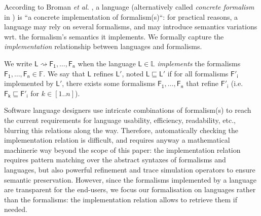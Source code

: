 According to Broman \emph{et al.} \cite{Broman-etAl:2012}, a language 
(alternatively called \emph{concrete formalism} in \cite{P:MPM:2006}) is ``a 
concrete implementation of formalism(s)``: 
for practical reasons, a language may rely on several 
formalisms, and may introduce semantics variations wrt. the formalism's 
semantics it implements. We formally capture the \emph{implementation} 
relationship between languages and formalisms.

\begin{Definition}
   
   We write $\mathsf{L} \rightsquigarrow \mathsf{F_1}, \ldots, \mathsf{F_n}$ 
when the language $\mathsf{L}\in\mathbb{L}$ \emph{implements} the formalisms 
$\mathsf{F_1}, \ldots, \mathsf{F_n}\in\mathbb{F}$. We say that $\mathsf{L}$ 
refines $\mathsf{L'}$, noted $\mathsf{L} \sqsubseteq \mathsf{L'}$ if for all 
formalisms $\mathsf{F'_i}$ implemented by $\mathsf{L'}$, there exists some 
formalisms $\mathsf{F_1}, \ldots, \mathsf{F_n}$ that refine $\mathsf{F'_i}$ 
(i.e. $\mathsf{F_k} \sqsubseteq \mathsf{F'_i}$ for $k\in [1..n]$).
\end{Definition}
\noindent
Software language designers use intricate combinations of formalism(s) to reach 
the current requirements for language usability, efficiency, readability, etc., 
blurring this relations along the way. 
Therefore, automatically checking the implementation relation is difficult, and 
requires anyway a mathematical machinerie way beyond the scope of this paper: 
the implementation relation requires pattern matching over the abstract 
syntaxes of formalisms and languages, but also powerful refinement and 
trace simulation operators to ensure semantic preservation. 
However, since the formalisms implemented by a language are transparent for the 
end-users, we focus our formalisation on languages rather than the formalisms: 
the implementation relation allows to retrieve them if needed.

